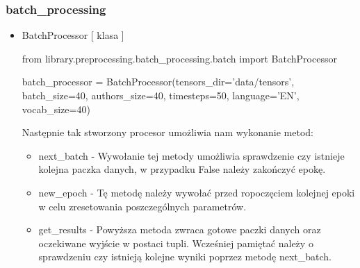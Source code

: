 \subsubsection{batch\_processing}

\myspace
{}
\myspace

\begin{itemize}

\item {BatchProcessor [ klasa ] }
\begin{import}
from library.preprocessing.batch_processing.batch import BatchProcessor

batch_processor = BatchProcessor(tensors_dir='data/tensors',
                                             batch_size=40,
                                             authors_size=40,
                                             timesteps=50,
                                             language='EN',
                                             vocab_size=40)
\end{import}

Następnie tak stworzony procesor umożliwia nam wykonanie metod:

\begin{itemize}
	\item {next\_batch } - 
	Wywołanie tej metody umożliwia sprawdzenie czy istnieje kolejna paczka danych, w przypadku False
	należy zakończyć epokę.
	
	\item {new\_epoch } - 
	Tę metodę należy wywołać przed ropoczęciem kolejnej epoki w celu zresetowania poszczególnych 
	parametrów.
	
	\item { get\_results } - 
	Powyższa metoda zwraca gotowe paczki danych oraz oczekiwane wyjście w postaci tupli. 
	Wcześniej pamiętać należy o sprawdzeniu czy istnieją kolejne wyniki poprzez metodę next\_batch.
\end{itemize}

\end{itemize}